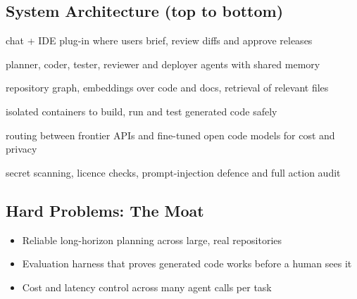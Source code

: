 \documentclass[10pt,a4paper]{article}
\begin{document}
\subsection*{System Architecture (top to bottom)}
\begin{tcolorbox}[colback=lay0,colframe=lay0,arc=2pt,top=1.5pt,bottom=1.5pt,left=6pt,before skip=2pt,after skip=2pt]\small{} chat + IDE plug-in where users brief, review diffs and approve releases\end{tcolorbox}
\begin{tcolorbox}[colback=lay1,colframe=lay1,arc=2pt,top=1.5pt,bottom=1.5pt,left=6pt,before skip=2pt,after skip=2pt]\small{} planner, coder, tester, reviewer and deployer agents with shared memory\end{tcolorbox}
\begin{tcolorbox}[colback=lay2,colframe=lay2,arc=2pt,top=1.5pt,bottom=1.5pt,left=6pt,before skip=2pt,after skip=2pt]\small{} repository graph, embeddings over code and docs, retrieval of relevant files\end{tcolorbox}
\begin{tcolorbox}[colback=lay3,colframe=lay3,arc=2pt,top=1.5pt,bottom=1.5pt,left=6pt,before skip=2pt,after skip=2pt]\small{} isolated containers to build, run and test generated code safely\end{tcolorbox}
\begin{tcolorbox}[colback=lay4,colframe=lay4,arc=2pt,top=1.5pt,bottom=1.5pt,left=6pt,before skip=2pt,after skip=2pt]\small{} routing between frontier APIs and fine-tuned open code models for cost and privacy\end{tcolorbox}
\begin{tcolorbox}[colback=lay5,colframe=lay5,arc=2pt,top=1.5pt,bottom=1.5pt,left=6pt,before skip=2pt,after skip=2pt]\small{} secret scanning, licence checks, prompt-injection defence and full action audit\end{tcolorbox}
\subsection*{Hard Problems: The Moat}\begin{itemize}\small
\item Reliable long-horizon planning across large, real repositories
\item Evaluation harness that proves generated code works before a human sees it
\item Cost and latency control across many agent calls per task
\end{itemize}
\end{document}
